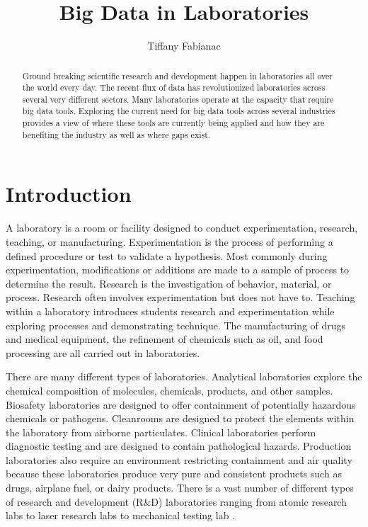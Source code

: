 \documentclass[sigconf]{acmart}
\begin{document}
\title{Big Data in Laboratories}

\author{Tiffany Fabianac} 
 \renewcommand{\shortauthors}{T. Fabianac} 

\begin{abstract}
Ground breaking scientific research and development happen in laboratories all over the world every day. The recent flux of data has revolutionized laboratories across several very different sectors. Many laboratories operate at the capacity that require big data tools. Exploring the current need for big data tools across several industries provides a view of where these tools are currently being applied and how they are benefiting the industry as well as where gaps exist.
\end{abstract}

\maketitle
\section{Introduction}
A laboratory is a room or facility designed to conduct experimentation, research, teaching, or manufacturing. Experimentation is the process of performing a defined procedure or test to validate a hypothesis. Most commonly during experimentation, modifications or additions are made to a sample of process to determine the result.  Research is the investigation of behavior, material, or process.  Research often involves experimentation but does not have to. Teaching within a laboratory introduces students research and experimentation while exploring processes and demonstrating technique. The manufacturing of drugs and medical equipment, the refinement of chemicals such as oil, and food processing are all carried out in laboratories.

There are many different types of laboratories. Analytical laboratories explore the chemical composition of molecules, chemicals, products, and other samples. Biosafety laboratories are designed to offer containment of potentially hazardous chemicals or pathogens. Cleanrooms are designed to protect the elements within the laboratory from airborne particulates. Clinical laboratories perform diagnostic testing and are designed to contain pathological hazards. Production laboratories also require an environment restricting containment and air quality because these laboratories produce very pure and consistent products such as drugs, airplane fuel, or dairy products. There is a vast number of different types of research and development (R\&D) laboratories ranging from atomic research labs to laser research labs to mechanical testing lab \cite{www-exilab}. 
\end{document}
